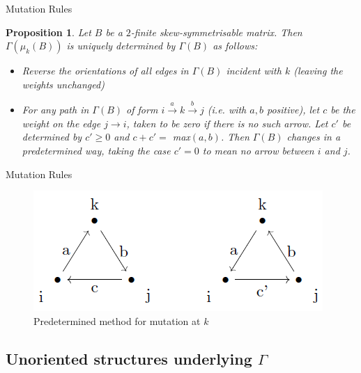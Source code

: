 \documentclass{beamer}
\newtheorem{proposition}{Proposition}
\begin{document}
\begin{frame}{Mutation Rules}
\begin{proposition}
Let $B$ be a $2$-finite skew-symmetrisable matrix. Then $\Gamma(\mu_k(B))$ is uniquely determined by $\Gamma(B)$ as follows:
\begin{itemize}
\item Reverse the orientations of all edges in $\Gamma(B)$ incident with $k$ (leaving the weights unchanged)
\item For any path in $\Gamma(B)$ of form $i \xrightarrow{a} k \xrightarrow{b} j$ (i.e. with $a,b$ positive), let $c$ be the weight on the edge $j \rightarrow i$, taken to be zero if there is no such arrow. Let $c'$ be determined by $c'\geq 0$ and 
$c+c' =$ max$(a,b)$. 
Then $\Gamma(B)$ changes in a predetermined way, taking the case $c' = 0$ to mean no arrow between $i$ and $j$.

\end{itemize}
\end{proposition}

\end{frame}

\begin{frame}{Mutation Rules}
\begin{figure}[h]
\centering
\includegraphics[scale = .65]{mutationrules.PNG}
\caption{Predetermined method for mutation at $k$}
\end{figure}
\end{frame}

\subsection{Unoriented structures underlying $\Gamma$}
\end{document}
